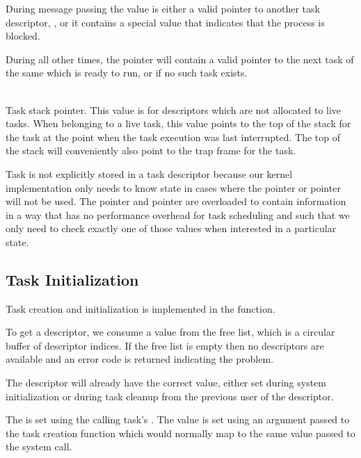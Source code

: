 \documentclass[pdftex,10pt,a4paper]{article}
\begin{document}
\begin{description}
    During message passing the value is either a valid pointer
    to another task descriptor, , or it contains a special
    value that indicates that the process is blocked.

    During all other times, the  pointer will contain a
    valid pointer to the next task of the same  which is
    ready to run, or  if no such task exists.

  \item[\ttt{int* sp}] \hfill \\
    Task stack pointer. This value is  for descriptors which
    are not allocated to live tasks. When belonging to a live task,
    this value points to the top of the stack for the task at the
    point when the task execution was last interrupted. The top of the
    stack will conveniently also point to the trap frame for the task.
\end{description}

\newpage

Task  is not explicitly stored in a task descriptor because
our kernel implementation only needs to know state in cases where the
 pointer or  pointer will not be used. The
 pointer and  pointer are overloaded to contain
 information in a way that has no performance overhead for
task scheduling and such that we only need to check exactly one of
those values when interested in a particular state.


\subsection*{Task Initialization}

Task creation and initialization is implemented in the
 function.

To get a descriptor, we consume a value from the free list, which
is a circular buffer of descriptor indices. If the free list is empty
then no descriptors are available and an error code is returned
indicating the problem.

The descriptor will already have the correct  value, either
set during system initialization or during task cleanup from the
previous user of the descriptor.

The  is set using the calling task's . The
 value is set using an argument passed to the task
creation function which would normally map to the same value passed to
the  system call.
\end{document}
